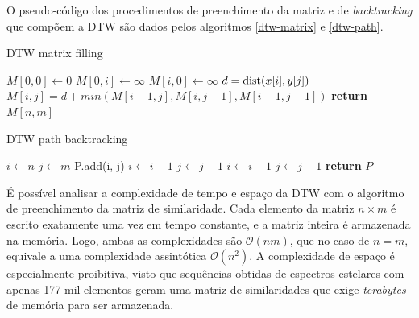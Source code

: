 O pseudo-código dos procedimentos de preenchimento da matriz \citep{hierarchical-time-clustering} e de \textit{backtracking} que compõem a DTW são dados pelos algoritmos \ref{dtw-matrix} e \ref{dtw-path}.

\begin{algorithm}
\caption{DTW matrix filling}\label{dtw-matrix}
\begin{algorithmic}[1]
    \State $M[0, 0]\gets 0$
        \State $M[0, i] \gets \infty$
    \EndFor
        \State $M[i, 0] \gets \infty$
    \EndFor
            \State $d = \mbox{dist}(x[i], y[j])$
            \State $M[i, j] = d + min(M[i-1, j], M[i, j-1], M[i-1, j-1])$
        \EndFor
    \EndFor
\State \textbf{return} $M[n, m]$
\EndProcedure
\end{algorithmic}
\end{algorithm}

\begin{algorithm}
\caption{DTW path backtracking}\label{dtw-path}
\begin{algorithmic}[1]
    \State $i\gets n$
    \State $j\gets m$
        \State P.add(i, j)
            \State $i \gets i - 1$
            \State $j \gets j - 1$
            \State $i \gets i - 1$
        \Else
            \State $j \gets j - 1$
        \EndIf
    \EndWhile
\State \textbf{return} $P$
\EndProcedure
\end{algorithmic}
\end{algorithm}

É possível analisar a complexidade de tempo e espaço da DTW com o algoritmo de preenchimento da matriz de similaridade. Cada elemento da matriz $n \times m$ é escrito exatamente uma vez em tempo constante, e a matriz inteira é armazenada na memória. Logo, ambas as complexidades são $\mathcal{O}(nm)$, que no caso de $n = m$, equivale a uma complexidade assintótica $\mathcal{O}(n^2)$. A complexidade de espaço é especialmente proibitiva, visto que sequências obtidas de espectros estelares com apenas 177 mil elementos geram uma matriz de similaridades que exige \textit{terabytes} de memória para ser armazenada.

